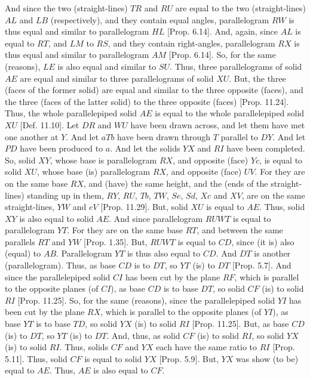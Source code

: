 \begin{Parallel}{}{}
{And since the two (straight-lines) $TR$ and $RU$ are
equal to the two (straight-lines) $AL$ and $LB$ (respectively), and
they contain equal angles, parallelogram $RW$ is thus  equal
and similar to parallelogram $HL$ [Prop. 6.14]. 
And, again, since $AL$ is equal to $RT$, and $LM$ to $RS$, and they contain right-angles, parallelogram $RX$ is thus equal and similar to
parallelogram $AM$ [Prop. 6.14].  So, for the
same (reasons), $LE$ is also equal and similar to $SU$. Thus, three
parallelograms of solid $AE$ are equal and similar to three parallelograms of
 solid $XU$. But, the three (faces of the former solid)
are equal and similar to the three opposite (faces), and the three (faces
of the
latter solid) to the three opposite (faces) [Prop. 11.24]. Thus, the whole
parallelepiped solid $AE$ is equal to the whole parallelepiped solid
$XU$ [Def. 11.10]. Let $DR$ and
$WU$ have been drawn across, and let them have met one another at $Y$.
And let $aTb$ have been drawn through $T$ parallel to $DY$. And let
$PD$ have been produced to $a$. And let the solids $YX$ and $RI$ have been 
completed. So,  solid $XY$, whose base is parallelogram $RX$,
and opposite (face) $Yc$,  is equal to  solid $XU$, whose base
(is) parallelogram $RX$, and opposite (face) $UV$. For they are
on the same base $RX$, and (have) the same height,  and the (ends of the straight-lines) standing up in them, $RY$, $RU$, $Tb$, $TW$, $Se$, $Sd$, $Xc$ and $XV$, are on the same straight-lines, $YW$ and $eV$ 
[Prop. 11.29].  But, solid $XU$ is equal to
$AE$. Thus, solid $XY$ is also equal to solid $AE$. And since
parallelogram $RUWT$ is equal to parallelogram $YT$. For they are
on the same base $RT$, and between the same parallels $RT$ and $YW$
[Prop. 1.35]. But, $RUWT$ is equal to
$CD$, since (it is) also (equal) to $AB$. Parallelogram $YT$ is thus also
equal to $CD$. And $DT$ is another (parallelogram). Thus, as base $CD$
is to $DT$, so $YT$ (is) to $DT$ [Prop. 5.7]. 
And since the parallelepiped solid $CI$ has been cut by the plane
$RF$, which is parallel to the opposite planes (of $CI$), as  base $CD$
is to base $DT$, so solid $CF$ (is) to solid $RI$ [Prop. 11.25]. So, for the same (reasons), since the parallelepiped solid
$YI$ has been cut by the plane $RX$, which is parallel to the opposite
planes (of $YI$), as base $YT$ is to base $TD$, so solid $YX$ (is)
 to solid $RI$ [Prop. 11.25]. But, as base $CD$ (is) to $DT$, so $YT$ (is) to $DT$. And, thus, as solid $CF$ (is) to solid $RI$,
so solid $YX$ (is) to solid $RI$. Thus,  solids $CF$ and
$YX$ each have the same ratio to $RI$ [Prop. 5.11]. Thus, solid $CF$
is equal to solid $YX$ [Prop. 5.9]. But,
$YX$ was show (to be) equal to $AE$. Thus, $AE$ is also equal to
$CF$.

}
\end{Parallel}
